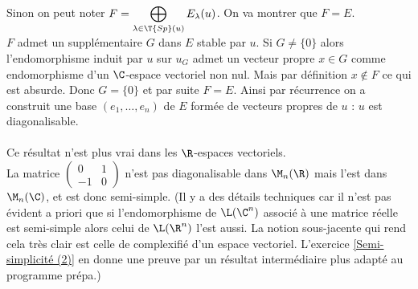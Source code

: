 \documentclass[8pt]{book}
\begin{document}
	Sinon on peut noter $F=\displaystyle\bigoplus_{\lambda\in \T{Sp}(u)}E_\lambda(u)$. On va montrer que $F=E$.\\
	$F$ admet un supplémentaire $G$ dans $E$ stable par $u$. Si $G\ne\{0\}$ alors l'endomorphisme induit par $u$ sur $u_G$ admet un vecteur propre $x\in G$ comme endomorphisme d'un $\C$-espace vectoriel non nul. Mais par définition $x\notin F$ ce qui est absurde. Donc $G=\{0\}$ et par suite $F=E$.
	Ainsi par récurrence on a construit une base $(e_1,\dots,e_n)$ de $E$ formée de vecteurs propres de $u$ : $u$ est diagonalisable.\\\\
	Ce résultat n'est plus vrai dans les $\R$-espaces vectoriels.\\
	La matrice $\begin{pmatrix}
		0&1\\
		-1&0
	\end{pmatrix}$ n'est pas diagonalisable dans $\M_n(\R)$ mais l'est dans $\M_n(\C)$, et est donc semi-simple. (Il y a des détails techniques car il n'est pas évident a priori que si l'endomorphisme de $\L(\C^n)$ associé à une matrice réelle est semi-simple alors celui de $\L(\R^n)$ l'est aussi. La notion sous-jacente qui rend cela très clair est celle de complexifié d'un espace vectoriel. L'exercice \ref{Semi-simplicité (2)} en donne une preuve par un résultat intermédiaire plus adapté au programme prépa.)
	
\end{document}
